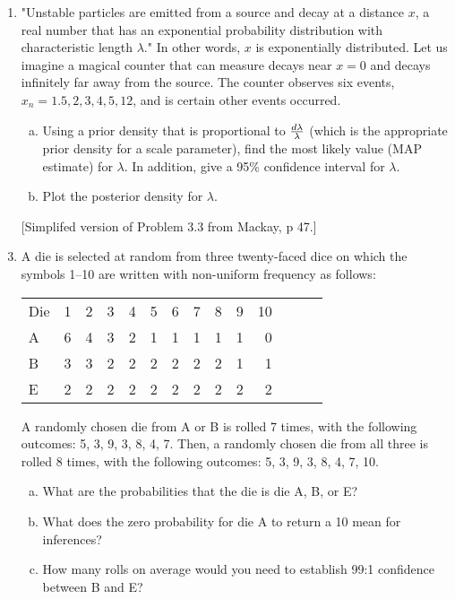 \documentclass[12pt]{book}
\theoremstyle{definition}
\begin{document}
\begin{enumerate}
\item\label{breaths}

"Unstable particles are emitted from a source and decay at a distance $x$, a real number that has an exponential probability distribution with characteristic length $\lambda$."  In other words, $x$ is exponentially distributed. Let us imagine a magical counter that can measure decays near $x=0$ and decays infinitely far away from the source. The counter observes six events, ${x_n} =  {1.5,2,3,4,5,12}$, and is certain other events occurred. 

\begin{enumerate}[a.]
  \item	Using a prior density that is proportional to ${d\lambda }\over {\lambda}$ (which is the appropriate prior density for a scale parameter), find the most likely value (MAP estimate) for $\lambda$. In addition, give a 95\% confidence interval for $\lambda$.
  \item Plot the posterior density for $\lambda$.
\end{enumerate}
 
\item[] [Simplifed version of Problem 3.3 from Mackay, p 47.] 

\item\label{toscientific} A die is selected at random from three twenty-faced dice on which the symbols 1–10 are written with non-uniform frequency as follows: 

\begin{tabular} {l r r r r r r r r r r r r r}
Die & 1 & 2 & 3 & 4 & 5 & 6 & 7 & 8 & 9 & 10 \\
A & 6 & 4 & 3 & 2 & 1 & 1 & 1 & 1 & 1 & 0  \\
B & 3 & 3 & 2 & 2 & 2 & 2 & 2 & 2 & 1 & 1 \\
E & 2 & 2 & 2 & 2 & 2 & 2 & 2 & 2 & 2 & 2 \\
\end{tabular}

A randomly chosen die from A or B is rolled 7 times, with the following outcomes: 5, 3, 9, 3, 8, 4, 7. Then, a randomly chosen die from all three is rolled 8 times, with the following outcomes: 5, 3, 9, 3, 8, 4, 7, 10. 

 \begin{enumerate}[a.]
   \item What are the probabilities that the die is die A, B, or E?
   \item\label{convert} What does the zero probability for die A to return a 10 mean for inferences? 
   \item How many rolls on average would you need to establish 99:1 confidence between B and E? 
 \end{enumerate}  


\end{enumerate}
\end{document}

